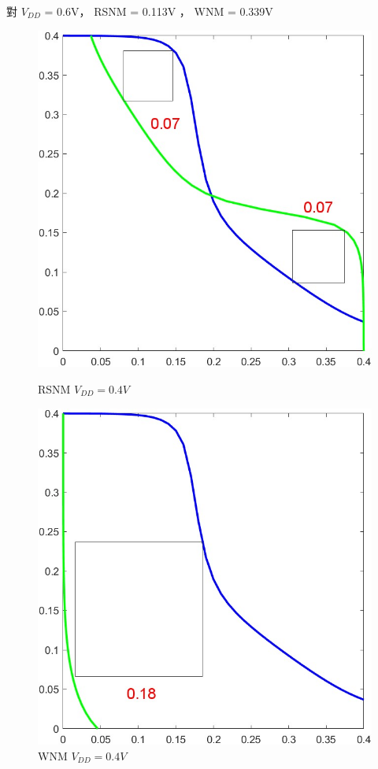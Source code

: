 \documentclass{article}
\begin{document}
\vspace*{-1cm}
對 $V_{DD}$ = 0.6V， RSNM = 0.113V ， WNM = 0.339V

\begin{figure}[H]
\centering
\begin{minipage}[t]{0.28\textwidth}
\centering
    \includegraphics[width=\textwidth]{./img/2023-11-12-01-09-40.png}
\caption{RSNM $V_{DD} = 0.4V$}
\label{rsnm04}
\end{minipage}
\qquad
\begin{minipage}[t]{0.28\textwidth}
\centering
    \includegraphics[width=\textwidth]{./img/2023-11-12-01-10-34.png}
\caption{WNM $V_{DD} = 0.4V$}
\label{wnm04}
\end{minipage}
\end{figure}
\end{document}
